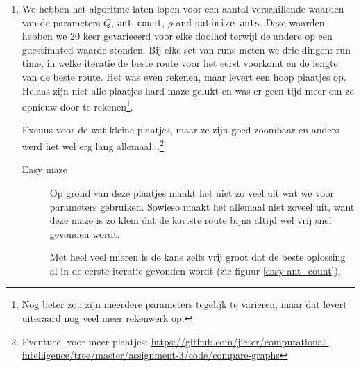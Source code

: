 \documentclass[a4paper,10pt,fleqn]{article}
\begin{document}
\begin{enumerate}[1.]
\begin{description}
      \end{description}


    \item We hebben het algoritme laten lopen voor een aantal verschillende waarden van de parameters $Q$, \verb|ant_count|, $\rho$ and \verb|optimize_ants|. Deze waarden hebben we 20 keer gevarieeerd voor elke doolhof terwijl de andere op een guestimated waarde stonden. Bij elke set van runs meten we drie dingen: run time, in welke iteratie de beste route voor het eerst voorkomt en de lengte van de beste route.
    Het was even rekenen, maar levert een hoop plaatjes op. Helaas zijn niet alle plaatjes hard maze gelukt en was er geen tijd meer om ze opnieuw door te rekenen\footnote{Nog beter zou zijn meerdere parameters tegelijk te varieren, maar dat levert uiteraard nog veel meer rekenwerk op.}.

    Excuus voor de wat kleine plaatjes, maar ze zijn goed zoombaar en anders werd het wel erg lang allemaal...\footnote{Eventueel voor meer plaatjes: \url{https://github.com/jieter/computational-intelligence/tree/master/assignment-3/code/compare-graphs}}




    \newpage

    \begin{description}
        \item[Easy maze] Op grond van deze plaatjes maakt het niet zo veel uit wat we voor parameters gebruiken. Sowieso maakt het allemaal niet zoveel uit, want deze maze is zo klein dat de kortste route bijna altijd wel vrij snel gevonden wordt.

        Met heel veel mieren is de kans zelfs vrij groot dat de beste oplossing al in de eerste iteratie gevonden wordt (zie figuur \ref{easy-ant_count}).


\end{description}
\end{enumerate}
\end{document}
